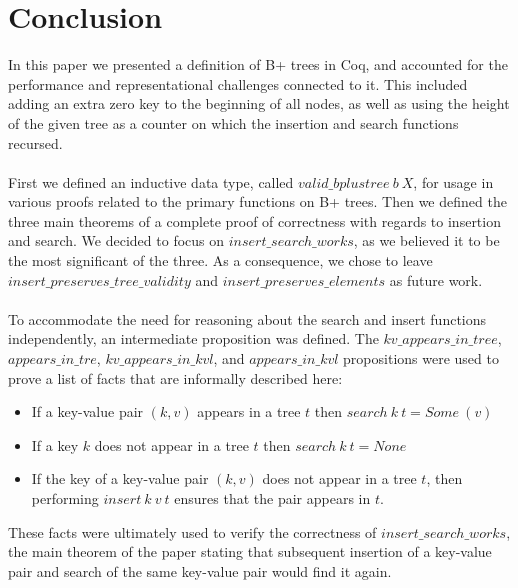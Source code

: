 \section{Conclusion}
\label{sec:Conclusion}
In this paper we presented a definition of B+ trees in Coq, and accounted for the performance and representational challenges connected to it. This included adding an extra zero key to the beginning of all nodes, as well as using the height of the given tree as a counter on which the insertion and search functions recursed. 
\paragraph{}
First we defined an inductive data type, called $valid\_bplustree~b~X$, for usage in various proofs related to the primary functions on B+ trees. Then we defined the three main theorems of a complete proof of correctness with regards to insertion and search. We decided to focus on $insert\_search\_works$, as we believed it to be the most significant of the three. As a consequence, we chose to leave $insert\_preserves\_tree\_validity$ and $insert\_preserves\_elements$ as future work.
\paragraph{}
To accommodate the need for reasoning about the search and insert functions independently, an intermediate proposition was defined. The $kv\_appears\_in\_tree$, $appears\_in\_tre$, $kv\_appears\_in\_kvl$, and $appears\_in\_kvl$ propositions were used to prove a list of facts that are informally described here:

\begin{itemize}
	\item If a key-value pair $(k, v)$ appears in a tree $t$ then $search~k~t = Some~(v)$
	\item If a key $k$ does not appear in a tree $t$ then $search~k~t = None$
	\item If the key of a key-value pair $(k, v)$ does not appear in a tree $t$, then performing $insert~k~v~t$ ensures that the pair appears in $t$.
\end{itemize} 

These facts were ultimately used to verify the correctness of $insert\_search\_works$, the main theorem of the paper stating that subsequent insertion of a key-value pair and search of the same key-value pair would find it again.
